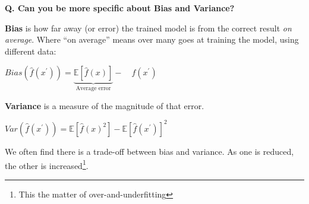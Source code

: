 \begin{frame}[fragile]{\textbf{Q. Can you be more specific about Bias and Variance?}}
  \begin{wideitemize}
    \item \textbf{Bias} is how far away (or error) the trained model is from the correct
    result \textit{on average}. Where ``on average'' means over many goes at
    training the model, using different data:
    \begin{wideitemize}
    \item $Bias(\hat{f}(x^{'})) = \underbrace{\mathbb{E}[\hat{f}(x)]}_{\text{Average error}} - \quad f(x^{'})$
    \end{wideitemize}
    \item \textbf{Variance} is a measure of the magnitude of that error.
    \begin{wideitemize}
    \item $Var(\hat{f}(x^{'})) = \mathbb{E}[\hat{f}(x)^{2}] - \mathbb{E}[\hat{f}(x^{'})]^{2}$
    \end{wideitemize}
    \item We often find there is a trade-off between bias and variance. As one is reduced,
    the other is increased\footnote{This the matter of over-and-underfitting}.
  \end{wideitemize}
\end{frame}

